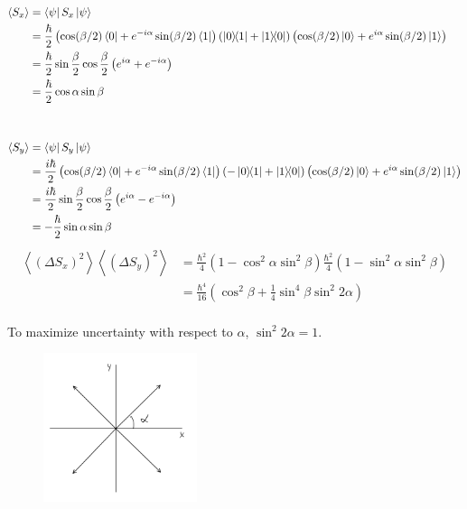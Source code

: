 \documentclass{article}
\begin{document}
\begin{align*}
   \left\langle S_{x}\right\rangle &=  \bra{\psi}S_x \ket{\psi}\\
   &=\frac{\hbar}{2}\left(\cos (\beta / 2) \bra{0} + e^{-i \alpha} \sin (\beta / 2) \bra{1}\right)\left(\ketbra{0}{1}+\ketbra{1}{0}\right) \left(\cos (\beta / 2) \ket{0} + e^{i \alpha} \sin (\beta / 2) \ket{1}\right)\\
   &= \frac{\hbar}{2} \sin \frac{\beta}{2} \cos \frac{\beta}{2}\left(e^{i \alpha}+e^{-i \alpha}\right) \\
   &= \frac{\hbar}{2}\cos \alpha \sin \beta\\
   &\\
   &\\
   \left\langle S_{y}\right\rangle &=  \bra{\psi}S_y \ket{\psi}\\
   &=\frac{i\hbar}{2}\left(\cos (\beta / 2) \bra{0} + e^{-i \alpha} \sin (\beta / 2) \bra{1}\right) (-\ketbra{0}{1}+\ketbra{1}{0}) \left(\cos (\beta / 2) \ket{0} + e^{i \alpha} \sin (\beta / 2) \ket{1}\right)\\
   &= \frac{i \hbar}{2} \sin \frac{\beta}{2} \cos \frac{\beta}{2}\left(e^{i \alpha}-e^{-i \alpha}\right) \\
   &= -\frac{\hbar}{2}\sin \alpha \sin \beta\\
\end{align*}
\begin{align*}
   \left\langle\left(\Delta S_{x}\right)^{2}\right\rangle\left\langle\left(\Delta S_{y}\right)^{2}\right\rangle&= \frac{\hbar^{2}}{4}\left(1-\cos ^{2} \alpha\sin ^{2} \beta \right)\frac{\hbar^{2}}{4}\left(1-\sin ^{2} \alpha \sin ^{2} \beta\right)\\
   &= \frac{\hbar^{4}}{16}\left(\cos ^{2} \beta+\frac{1}{4} \sin ^{4} \beta \sin ^{2} 2 \alpha\right)\\
\end{align*}

To maximize uncertainty with respect to $\alpha$, $\sin^2 {2\alpha} = 1$.

\begin{figure}[H]
    \centering
    \includegraphics[width=0.4\textwidth]{figures/problem9.png}
    \label{fig:my_label}
\end{figure}
\end{document}
